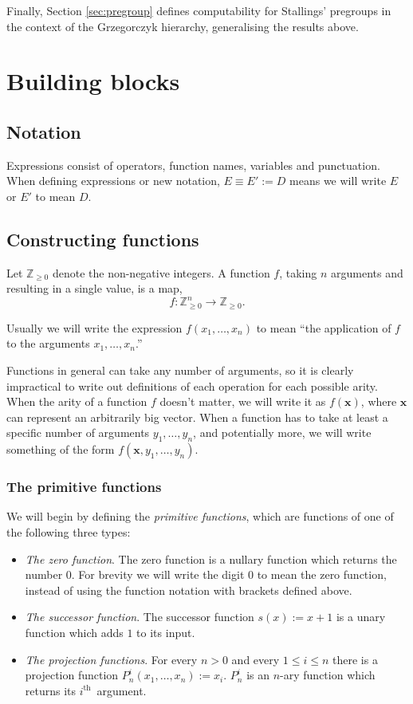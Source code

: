 \documentclass[a4paper]{article}
\newcommand{\ZZ}{\mathbb{Z}}
\newcommand{\ith}{$i^{\textrm{th}}$~}
\newcommand{\xvec}{\mathbf{x}}	%
\theoremstyle{plain}
\theoremstyle{definition}
\begin{document}
Finally, Section \ref{sec:pregroup} defines computability for Stallings' pregroups \cite{Stallings_1971} in the context of the Grzegorczyk hierarchy, generalising the results above.


\section{Building blocks \label{buildingblocks}}
 
\subsection{Notation}
Expressions consist of operators, function names, variables and punctuation. 
When defining expressions or new notation, $E \equiv E' := D$ means we will write $E$ or $E'$ to mean $D$.

\subsection{Constructing functions}
Let $\ZZ_{\geq 0}$ denote the non-negative integers. A function $f$, taking $n$ arguments and resulting in a single value, is a map,
\[f: \ZZ_{\geq 0}^n \rightarrow \ZZ_{\geq 0}.\]

Usually we will write the expression $f(x_1, \dots, x_n)$ to mean ``the application of $f$ to the arguments $x_1,\dots,x_n$.''

Functions in general can take any number of arguments, so it is clearly impractical to write out definitions of each operation for each possible arity. When the arity of a function $f$ doesn't matter, we will write it as $f(\xvec)$, where $\xvec$ can represent an arbitrarily big vector.  When a function has to take at least a specific number of arguments $y_1, \dots, y_n$, and potentially more, we will write something of the form $f(\xvec, y_1, \dots, y_n)$.

\subsubsection{The primitive functions}

We will begin by defining the {\it primitive functions}, which are functions of one of the following three types:

\begin{itemize}
	\item {\em The zero function}. The zero function  is a nullary function which returns the number $0$. For brevity we will write the digit $0$ to mean the zero function, instead of using the function notation with brackets defined above.
	\item {\em The successor function}. The successor function $s(x) := x + 1$ is a unary function which adds $1$ to its input.
	\item {\em The projection functions}. For every $n > 0 $ and every $1 \leq i \leq n$ there is a projection function $P_n^i(x_1, \dots, x_n) := x_i$. $P_n^i$ is an $n$-ary function which returns its \ith argument.
\end{itemize}
\end{document}
